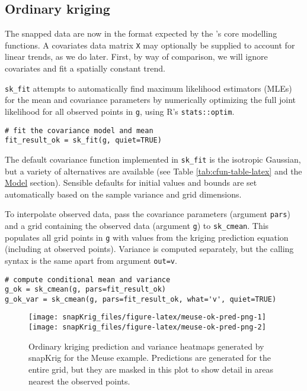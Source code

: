 \hypertarget{ordinary-kriging}{%
\subsection{Ordinary kriging}\label{ordinary-kriging}}

The snapped data are now in the format expected by the 's core modelling functions. A covariates data matrix \texttt{X} may optionally be supplied to account for linear trends, as we do later. First, by way of comparison, we will ignore covariates and fit a spatially constant trend.

\texttt{sk\_fit} attempts to automatically find maximum likelihood estimators (MLEs) for the mean and covariance parameters by numerically optimizing the full joint likelihood for all observed points in \texttt{g}, using R's \texttt{stats::optim}.

\begin{verbatim}
# fit the covariance model and mean
fit_result_ok = sk_fit(g, quiet=TRUE)
\end{verbatim}

The default covariance function implemented in \texttt{sk\_fit} is the isotropic Gaussian, but a variety of alternatives are available
(see Table \ref{tab:cfun-table-latex} and the \protect\hyperlink{model}{Model} section). Sensible defaults for initial values and bounds are set automatically based on the sample variance and grid dimensions.

To interpolate observed data, pass the covariance parameters (argument \texttt{pars}) and a grid containing the observed data (argument \texttt{g}) to \texttt{sk\_cmean}. This populates all grid points in \texttt{g} with values from the kriging prediction equation (including at observed points). Variance is computed separately, but the calling syntax is the same apart from argument \texttt{out=\textquotesingle{}v\textquotesingle{}}.

\begin{verbatim}
# compute conditional mean and variance 
g_ok = sk_cmean(g, pars=fit_result_ok)
g_ok_var = sk_cmean(g, pars=fit_result_ok, what='v', quiet=TRUE)
\end{verbatim}

\begin{figure}
\texttt{[image: snapKrig\_files/figure-latex/meuse-ok-pred-png-1]} \texttt{[image: snapKrig\_files/figure-latex/meuse-ok-pred-png-2]} \caption{Ordinary kriging prediction and variance heatmaps generated by snapKrig for the Meuse example. Predictions are generated for the entire grid, but they are masked in this plot to show detail in areas nearest the observed points.}\label{fig:meuse-ok-pred-png}
\end{figure}


